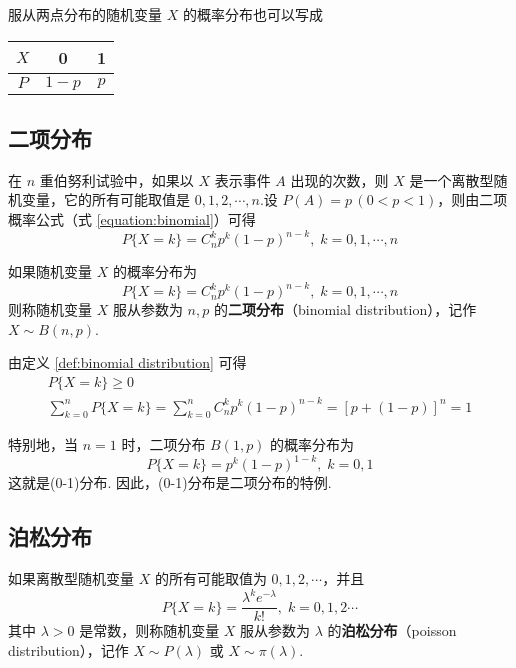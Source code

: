 服从两点分布的随机变量 $X$ 的概率分布也可以写成
\begin{table*}[htbp]
    \centering

    \begin{tabular}{c | c c}
        \hline
        $X$ & 0 & 1 \\
        \hline
        $P$ & $1-p$ & $p$ \\
        \hline
    \end{tabular}
\end{table*}

\subsection{二项分布}

在 $n$ 重伯努利试验中，如果以 $X$ 表示事件 $A$ 出现的次数，则 $X$ 是一个离散型随机变量，它的所有可能取值是 $0,1,2,\cdots,n$.设 $P(A)=p\,(0<p<1)$，则由二项概率公式（式 \eqref{equation:binomial}）可得
$$
P\{X=k\}=C_n^k p^k (1-p)^{n-k}, \; k=0,1,\cdots,n
$$

\begin{definition} \label{def:binomial distribution}
    如果随机变量 $X$ 的概率分布为
    $$
    P\{X=k\}=C_n^k p^k (1-p)^{n-k}, \; k=0,1,\cdots,n
    $$
    则称随机变量 $X$ 服从参数为 $n,p$ 的\textbf{二项分布}（binomial distribution），记作 $X \sim B(n,p)$.
\end{definition}

由定义 \ref{def:binomial distribution} 可得
\begin{gather*}
    P\{X=k\} \geqslant 0\\
    \sum_{k=0}^n P\{X=k\} = \sum_{k=0}^n C_n^k p^k (1-p)^{n-k} = [p+(1-p)]^n=1
\end{gather*}

特别地，当 $n=1$ 时，二项分布 $B(1,p)$ 的概率分布为
$$
P\{X=k\} = p^k (1-p)^{1-k}, \; k=0,1
$$
这就是(0-1)分布. 因此，(0-1)分布是二项分布的特例.

\subsection{泊松分布}

\begin{definition}
    如果离散型随机变量 $X$ 的所有可能取值为 $0,1,2,\cdots$，并且
    $$
    P\{X=k\} = \dfrac{\lambda^k e^{-\lambda}}{k!}, \; k=0,1,2\cdots
    $$
    其中 $\lambda > 0$ 是常数，则称随机变量 $X$ 服从参数为 $\lambda$ 的\textbf{泊松分布}（poisson distribution），记作 $X \sim P(\lambda)$ 或 $X \sim \pi(\lambda)$.
\end{definition}

